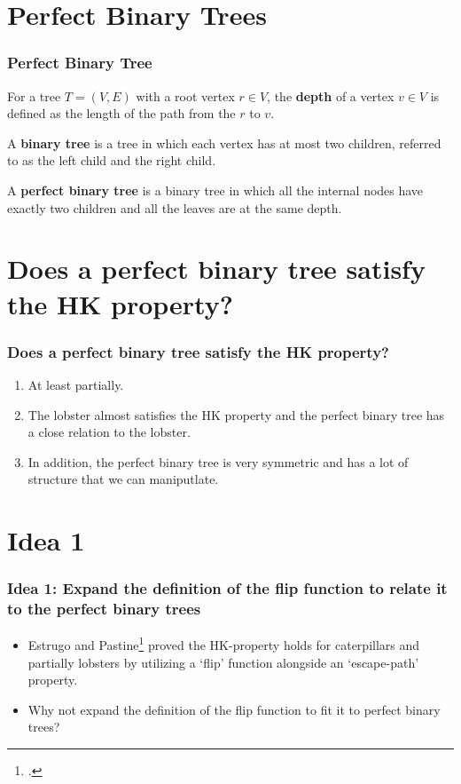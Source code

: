 \documentclass[10pt,]{beamer}
\theoremstyle{conjectureStyle}
\theoremstyle{notationStyle}
\theoremstyle{claimStyle}
\begin{document}
\section{Perfect Binary Trees}
\begin{frame}\frametitle{Perfect Binary Tree}
    \begin{definition}
        For a tree $T = (V, E)$ with a root vertex $r \in V$, the \textbf{depth} of a vertex $v \in V$ is defined as the length of the path from the $r$ to $v$.
    \end{definition}
    \pause
    \begin{definition}
        A \textbf{binary tree} is a tree in which each vertex has at most two children, referred to as the left child and the right child.
    \end{definition}
    \pause
    \begin{definition}
        A \textbf{perfect binary tree} is a binary tree in which all the internal nodes have exactly two children and all the leaves are at the same depth.
    \end{definition}
\end{frame}



\section{Does a perfect binary tree satisfy the HK property?}
\begin{frame}\frametitle{Does a perfect binary tree satisfy the HK property?}
    \begin{enumerate}[<+->]
        \setlength\itemsep{2em}
        \item At least partially.
        \item The lobster almost satisfies the HK property and the perfect binary tree has a close relation to the lobster.
        \item In addition, the perfect binary tree is very symmetric and has a lot of structure that we can maniputlate.
    \end{enumerate}
\end{frame}

\section{Idea 1}
\begin{frame}\frametitle{Idea 1: Expand the definition of the flip function to relate it to the perfect binary trees}
    \begin{itemize}
        \item Estrugo and Pastine\footcite{MR2763040} proved the HK-property holds for caterpillars and partially lobsters by utilizing a `flip' function alongside an `escape-path' property.

        \item Why not expand the definition of the flip function to fit it to perfect binary trees?
    \end{itemize}
\end{frame}
\end{document}
